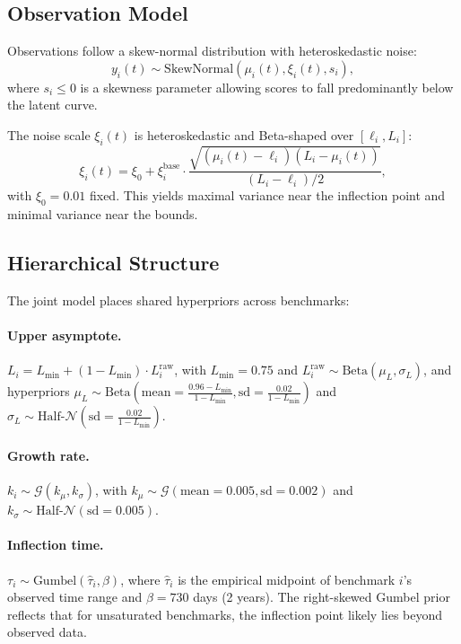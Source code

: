 \documentclass[letterpaper,twocolumn]{article}
\begin{document}
\subsection{Observation Model}

Observations follow a skew-normal distribution with heteroskedastic noise:
$$y_i(t) \sim \text{SkewNormal}(\mu_i(t), \xi_i(t), s_i),$$
where $s_i \leq 0$ is a skewness parameter allowing scores to fall predominantly below the latent curve.

The noise scale $\xi_i(t)$ is heteroskedastic and Beta-shaped over $[\ell_i, L_i]$:
$$\xi_i(t) = \xi_0 + \xi_i^{\text{base}} \cdot \frac{\sqrt{(\mu_i(t) - \ell_i)(L_i - \mu_i(t))}}{(L_i - \ell_i)/2},$$
with $\xi_0 = 0.01$ fixed. This yields maximal variance near the inflection point and minimal variance near the bounds.

\subsection{Hierarchical Structure}

The joint model places shared hyperpriors across benchmarks:

\paragraph{Upper asymptote.} $L_i = L_{\min} + (1 - L_{\min}) \cdot L_i^{\text{raw}}$, with $L_{\min} = 0.75$ and $L_i^{\text{raw}} \sim \text{Beta}(\mu_L, \sigma_L)$, and hyperpriors $\mu_L \sim \text{Beta}\left(\text{mean} = \frac{0.96 - L_\text{min}}{1 - L_\text{min}}, \text{sd} = \frac{0.02}{1 - L_\text{min}}\right)$ and $\sigma_L \sim \text{Half-}\mathcal N\left(\text{sd}=\frac{0.02}{1 - L_\text{min}}\right)$.

\paragraph{Growth rate.} $k_i \sim \mathcal G(k_{\mu}, k_{\sigma})$, with $k_{\mu} \sim \mathcal G(\text{mean}=0.005, \text{sd}=0.002)$ and $k_{\sigma} \sim \text{Half-}\mathcal N(\text{sd}=0.005)$.

\paragraph{Inflection time.} $\tau_i \sim \text{Gumbel}(\hat{\tau}_i, \beta)$, where $\hat{\tau}_i$ is the empirical midpoint of benchmark $i$'s observed time range and $\beta = 730$ days (2 years). The right-skewed Gumbel prior reflects that for unsaturated benchmarks, the inflection point likely lies beyond observed data.
\end{document}
